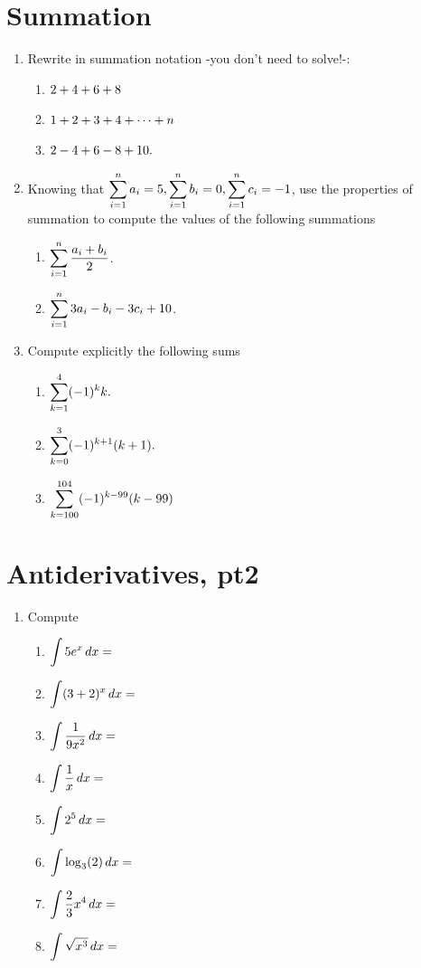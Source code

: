 \documentclass[10pt]{article}
\begin{document}
   \section{Summation}
   \begin{enumerate}

    
    \item Rewrite in summation notation -you don't need to solve!-:
    \begin{enumerate}
        \item $\displaystyle 2 + 4 + 6 + 8 $
        \item $\displaystyle 1+2+3+4 + \cdots + n$
        \item $\displaystyle 2 - 4 + 6 - 8 + 10.$
    \end{enumerate}

    \item Knowing that $\displaystyle \sum_{i=1}^{n}a_i=5,\sum_{i=1}^{n}b_i=0,\sum_{i=1}^{n}c_i=-1$, use the properties of summation to compute the values of the following summations
    \begin{enumerate}
        \item $\displaystyle \sum_{i=1}^n \frac{a_i+b_i}{2}$.
        \item $\displaystyle \sum_{i=1}^n 3a_i-b_i-3c_i+10$.
    \end{enumerate}
        \item Compute explicitly the following sums 
    \begin{enumerate}
        \item $\displaystyle \sum_{k = 1}^4 (-1)^k k.$
        \item $\displaystyle \sum_{k = 0}^3 (-1)^{k+1} (k+1).$
        \item $\displaystyle \sum_{k = 100}^{104} (-1)^{k-99} (k-99)$
    \end{enumerate}
    \end{enumerate}

\newpage 

\section{Antiderivatives, pt2}
\begin{enumerate}
    \item Compute
    \begin{enumerate}
        \item $\displaystyle \int 5e^x \,dx=$
        \item $\displaystyle \int (3+2)^x \,dx=$ 
        \item $\displaystyle \int \frac{1}{9x^2} \,dx =$ 
        \item $\displaystyle \int \frac{1}{x} \,dx =$
        \item $\displaystyle \int 2^5 \,dx =$ 
        \item $\displaystyle \int \log_3(2) \,dx =$ 
        \item $\displaystyle \int \frac23x^4 \,dx =$
        \item $\displaystyle \int \sqrt{x^3} \,dx =$
    \end{enumerate}
\end{enumerate}
\end{document}
